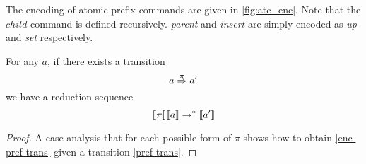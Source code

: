 \documentclass[sigplan,screen]{acmart}
\begin{document}

The encoding of atomic prefix commands are given in
\cref{fig:atc_enc}. Note that the $child$ command is defined
recursively. \textit{parent} and \textit{insert} are simply encoded as \textit{up} and \textit{set} respectively.

\begin{lemma}
  For any \abt $a$, if there exists a transition
  \begin{equation}  a \stackrel{\pi}{\Rightarrow} a' \label{pref-trans} \end{equation}
  we have a reduction sequence
  \begin{equation} \llbracket \pi \rrbracket \llbracket a \rrbracket \rightarrow^{*}\llbracket a' \rrbracket  \label{enc-pref-trans} \end{equation}
\end{lemma}
\begin{proof}
  A case analysis that for each possible form of $\pi$ shows how to
  obtain \eqref{enc-pref-trans} given a transition \eqref{pref-trans}.
\end{proof}
\end{document}

